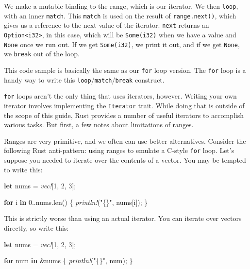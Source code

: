\documentclass[a4paper,]{book}
\newenvironment{Shaded}{\begin{snugshade}}{\end{snugshade}}
\newcommand{\KeywordTok}[1]{\textcolor[rgb]{0.13,0.29,0.53}{\textbf{{#1}}}}
\newcommand{\DecValTok}[1]{\textcolor[rgb]{0.00,0.00,0.81}{{#1}}}
\newcommand{\StringTok}[1]{\textcolor[rgb]{0.31,0.60,0.02}{{#1}}}
\newcommand{\PreprocessorTok}[1]{\textcolor[rgb]{0.56,0.35,0.01}{\textit{{#1}}}}
\newcommand{\NormalTok}[1]{{#1}}
\begin{document}
We make a mutable binding to the range, which is our iterator. We then
\texttt{loop}, with an inner \texttt{match}. This \texttt{match} is used
on the result of \texttt{range.next()}, which gives us a reference to
the next value of the iterator. \texttt{next} returns an
\texttt{Option\textless{}i32\textgreater{}}, in this case, which will be
\texttt{Some(i32)} when we have a value and \texttt{None} once we run
out. If we get \texttt{Some(i32)}, we print it out, and if we get
\texttt{None}, we \texttt{break} out of the loop.

This code sample is basically the same as our \texttt{for} loop version.
The \texttt{for} loop is a handy way to write this
\texttt{loop}/\texttt{match}/\texttt{break} construct.

\texttt{for} loops aren't the only thing that uses iterators, however.
Writing your own iterator involves implementing the \texttt{Iterator}
trait. While doing that is outside of the scope of this guide, Rust
provides a number of useful iterators to accomplish various tasks. But
first, a few notes about limitations of ranges.

Ranges are very primitive, and we often can use better alternatives.
Consider the following Rust anti-pattern: using ranges to emulate a
C-style \texttt{for} loop. Let's suppose you needed to iterate over the
contents of a vector. You may be tempted to write this:

\begin{Shaded}
\begin{Highlighting}[]
\KeywordTok{let} \NormalTok{nums = }\PreprocessorTok{vec!}\NormalTok{[}\DecValTok{1}\NormalTok{, }\DecValTok{2}\NormalTok{, }\DecValTok{3}\NormalTok{];}

\KeywordTok{for} \NormalTok{i }\KeywordTok{in} \DecValTok{0.}\NormalTok{.nums.len() \{}
    \PreprocessorTok{println!}\NormalTok{(}\StringTok{"\{\}"}\NormalTok{, nums[i]);}
\NormalTok{\}}
\end{Highlighting}
\end{Shaded}

This is strictly worse than using an actual iterator. You can iterate
over vectors directly, so write this:

\begin{Shaded}
\begin{Highlighting}[]
\KeywordTok{let} \NormalTok{nums = }\PreprocessorTok{vec!}\NormalTok{[}\DecValTok{1}\NormalTok{, }\DecValTok{2}\NormalTok{, }\DecValTok{3}\NormalTok{];}

\KeywordTok{for} \NormalTok{num }\KeywordTok{in} \NormalTok{&nums \{}
    \PreprocessorTok{println!}\NormalTok{(}\StringTok{"\{\}"}\NormalTok{, num);}
\NormalTok{\}}
\end{Highlighting}
\end{Shaded}
\end{document}
